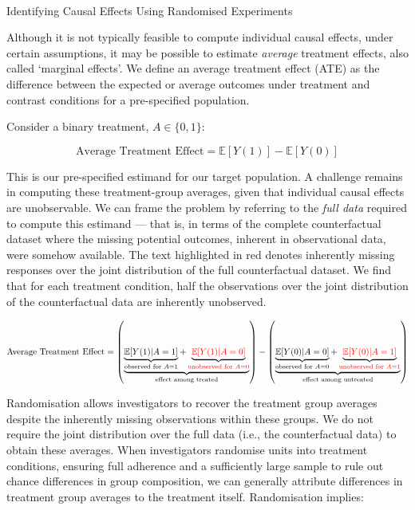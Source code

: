 \documentclass[
  single column]{article}
\makeatletter
\let\oldparagraph\paragraph
\renewcommand{\paragraph}{
    \@ifstar
      \xxxParagraphStar
      \xxxParagraphNoStar
  }
\newcommand{\xxxParagraphStar}[1]{\oldparagraph*{#1}\mbox{}}
\newcommand{\xxxParagraphNoStar}[1]{\oldparagraph{#1}\mbox{}}
\makeatother
\begin{document}
\paragraph{Identifying Causal Effects Using Randomised
Experiments}\label{identifying-causal-effects-using-randomised-experiments}

Although it is not typically feasible to compute individual causal
effects, under certain assumptions, it may be possible to estimate
\emph{average} treatment effects, also called `marginal effects'. We
define an average treatment effect (ATE) as the difference between the
expected or average outcomes under treatment and contrast conditions for
a pre-specified population.

Consider a binary treatment, \(A \in \{0,1\}\):

\[
\text{Average Treatment Effect} = \mathbb{E}[Y(1)] - \mathbb{E}[Y(0)]
\]

This is our pre-specified estimand for our target population. A
challenge remains in computing these treatment-group averages, given
that individual causal effects are unobservable. We can frame the
problem by referring to the \emph{full data} required to compute this
estimand --- that is, in terms of the complete counterfactual dataset
where the missing potential outcomes, inherent in observational data,
were somehow available. The text highlighted in red denotes inherently
missing responses over the joint distribution of the full counterfactual
dataset. We find that for each treatment condition, half the
observations over the joint distribution of the counterfactual data are
inherently unobserved.

\[
\text{Average Treatment Effect} = \left(\underbrace{\underbrace{\mathbb{E}[Y(1)|A = 1]}_{\text{observed for } A = 1} + \underbrace{\textcolor{red}{\mathbb{E}[Y(1)|A = 0]}}_{\textcolor{red}{\text{unobserved for } A = 0}}}_{\text{effect among treated}}\right) - \left(\underbrace{\underbrace{\mathbb{E}[Y(0)|A = 0]}_{\text{observed for } A = 0} + \underbrace{\textcolor{red}{\mathbb{E}[Y(0)|A = 1]}}_{\textcolor{red}{\text{unobserved for } A = 1}}}_{\text{effect among untreated}}\right)
\]

Randomisation allows investigators to recover the treatment group
averages despite the inherently missing observations within these
groups. We do not require the joint distribution over the full data
(i.e., the counterfactual data) to obtain these averages. When
investigators randomise units into treatment conditions, ensuring full
adherence and a sufficiently large sample to rule out chance differences
in group composition, we can generally attribute differences in
treatment group averages to the treatment itself. Randomisation implies:
\end{document}
